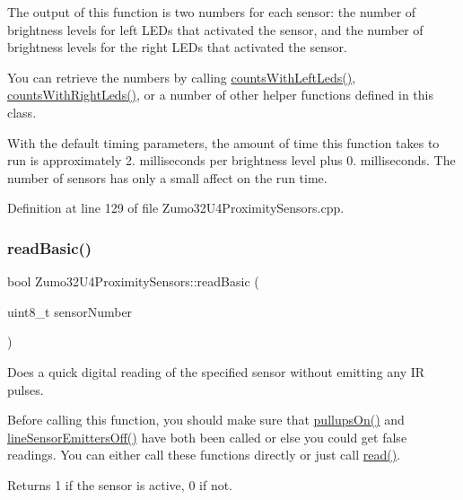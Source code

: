 The output of this function is two numbers for each sensor\+: the number of brightness levels for left L\+E\+Ds that activated the sensor, and the number of brightness levels for the right L\+E\+Ds that activated the sensor.

You can retrieve the numbers by calling \hyperlink{class_zumo32_u4_proximity_sensors_a734abb888814a97379c349e1deb8897f}{counts\+With\+Left\+Leds()}, \hyperlink{class_zumo32_u4_proximity_sensors_a2789f740828a81fe3c942998639355ae}{counts\+With\+Right\+Leds()}, or a number of other helper functions defined in this class.

With the default timing parameters, the amount of time this function takes to run is approximately 2. milliseconds per brightness level plus 0. milliseconds. The number of sensors has only a small affect on the run time. 

Definition at line 129 of file Zumo32\+U4\+Proximity\+Sensors.\+cpp.

\mbox{\label{class_zumo32_u4_proximity_sensors_a5c254dc2adf7c47203384241582349d3}} 
\subsubsection{\texorpdfstring{read\+Basic()}{readBasic()}}
{\footnotesize\ttfamily bool Zumo32\+U4\+Proximity\+Sensors\+::read\+Basic (\begin{DoxyParamCaption}\item[{uint8\+\_\+t}]{sensor\+Number }\end{DoxyParamCaption})}



Does a quick digital reading of the specified sensor without emitting any IR pulses. 

Before calling this function, you should make sure that \hyperlink{class_zumo32_u4_proximity_sensors_ae596289faf5921bc7c199cf73edf534e}{pullups\+On()} and \hyperlink{class_zumo32_u4_proximity_sensors_a583dada6ad676cbda2ec7d55b05338b8}{line\+Sensor\+Emitters\+Off()} have both been called or else you could get false readings. You can either call these functions directly or just call \hyperlink{class_zumo32_u4_proximity_sensors_a071d935e10e2a16a3ae2559d16a12683}{read()}.

\begin{DoxyReturn}{Returns}
1 if the sensor is active, 0 if not.
\end{DoxyReturn}

